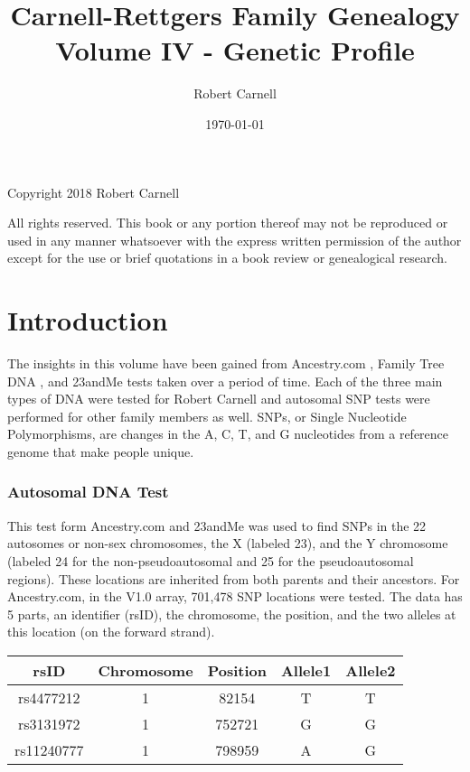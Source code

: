 \documentclass[11pt,letter]{book}
\title{\bf Carnell-Rettgers Family Genealogy \\
       \large Volume IV - Genetic Profile}
\author{Robert Carnell}
\date{\today}
\begin{document}
\frontmatter
\maketitle
\clearpage

\begingroup
\parindent 0pt
\parskip
\baselineskip
Copyright \textcopyright{} 2018 Robert Carnell

All rights reserved.  This book or any portion thereof may not be reproduced or used in any manner whatsoever with the express written permission of the author except for the use or brief quotations in a book review or genealogical research.
\endgroup
\clearpage

\tableofcontents
\mainmatter

\chapter{Introduction}

The insights in this volume have been gained from Ancestry.com , Family Tree DNA , and 23andMe  tests taken over a period of time.  Each of the three main types of DNA were tested for Robert Carnell and autosomal SNP tests were performed for other family members as well.  SNPs, or Single Nucleotide Polymorphisms, are changes in the A, C, T, and G nucleotides from a reference genome that make people unique.

\subsection{Autosomal DNA Test}

This test form Ancestry.com and 23andMe was used to find SNPs in the 22 autosomes or non-sex chromosomes, the X (labeled 23), and the Y chromosome (labeled 24 for the non-pseudoautosomal and 25 for the pseudoautosomal regions).  These locations are inherited from both parents and their ancestors.  For Ancestry.com, in the V1.0 array, 701,478 SNP locations were tested.  The data has 5 parts, an identifier (rsID), the chromosome, the position, and the two alleles at this location (on the forward strand).

\begin{center}
\begin{tabular}{c | c | c | c | c}
	rsID & Chromosome & Position & Allele1 & Allele2 \\
	\hline
	rs4477212 & 1 & 82154 & T & T \\
	rs3131972	& 1 & 752721 & G & G \\
	rs11240777 & 1 & 798959 & A & G \\
\end{tabular}
\end{center}
\end{document}
